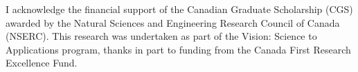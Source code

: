 \begin{acknowledgements}
\thispagestyle{plain}
\setcounter{page}{2}
I acknowledge the financial support of the Canadian Graduate Scholarship (CGS) awarded by the Natural Sciences and Engineering Research Council of Canada (NSERC). This research was undertaken as part of the Vision: Science to Applications program, thanks in part to funding from the Canada First Research Excellence Fund.
\end{acknowledgements}
